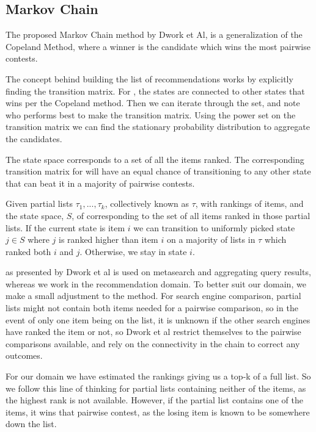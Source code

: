 \subsection{Markov Chain}\label{sec:markovchain}
The proposed Markov Chain method by Dwork et Al, \MC is a generalization of the Copeland Method, where a winner is the candidate which wins the most pairwise contests\citep{rank:aggregation}.

The concept behind building the list of recommendations works by explicitly finding the transition matrix. For \MC, the states are connected to other states that wins per the Copeland method. Then we can iterate through the set, and note who performs best to make the transition matrix. Using the power set on the transition matrix we can find the stationary probability distribution to aggregate the candidates.

The \MC state space corresponds to a set of all the items ranked. The corresponding transition matrix for \MC will have an equal chance of transitioning to any other state that can beat it in a majority of pairwise contests.

Given partial lists $\tau_1,...,\tau_k$, collectively known as $\tau$, with rankings of items, and the state space, $S$, of \MC corresponding to the set of all items ranked in those partial lists. If the current state is item $i$ we can transition to uniformly picked state $j \in S$ where $j$ is ranked higher than item $i$ on a majority of lists in $\tau$ which ranked both $i$ and $j$. Otherwise, we stay in state $i$.

\MC as presented by Dwork et al is used on metasearch and aggregating query results, whereas we work in the recommendation domain. To better suit our domain, we make a small adjustment to the method. For search engine comparison, partial lists might not contain both items needed for a pairwise comparison, so in the event of only one item being on the list, it is unknown if the other search engines have ranked the item or not, so Dwork et al restrict themselves to the pairwise comparisons available, and rely on the connectivity in the chain to correct any outcomes.

For our domain we have estimated the rankings giving us a top-k of a full list. So we follow this line of thinking for partial lists containing neither of the items, as the highest rank is not available. However, if the partial list contains one of the items, it wins that pairwise contest, as the losing item is known to be somewhere down the list.


